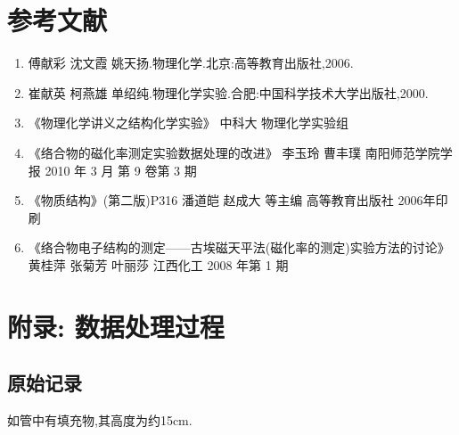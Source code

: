 \documentclass[11pt]{report}
\begin{document}
\part{参考文献}
\label{sec:org33f6a67}
\begin{enumerate}
\item 傅献彩 沈文霞 姚天扬.物理化学.北京:高等教育出版社,2006.
\item 崔献英 柯燕雄 单绍纯.物理化学实验.合肥:中国科学技术大学出版社,2000.
\item 《物理化学讲义之结构化学实验》 中科大 物理化学实验组
\item 《络合物的磁化率测定实验数据处理的改进》 李玉玲 曹丰璞 南阳师范学院学报 2010 年 3 月 第 9 卷第 3 期
\item 《物质结构》(第二版)P316 潘道皑 赵成大 等主编 高等教育出版社 2006年印刷
\item 《络合物电子结构的测定——古埃磁天平法(磁化率的测定)实验方法的讨论》 黄桂萍 张菊芳 叶丽莎 江西化工 2008 年第 1 期
\end{enumerate}

\part{附录: 数据处理过程}
\label{sec:orgb25180f}
\chapter{原始记录}
\label{sec:orgddd2cb3}
如管中有填充物,其高度为约15cm.   
\end{document}

